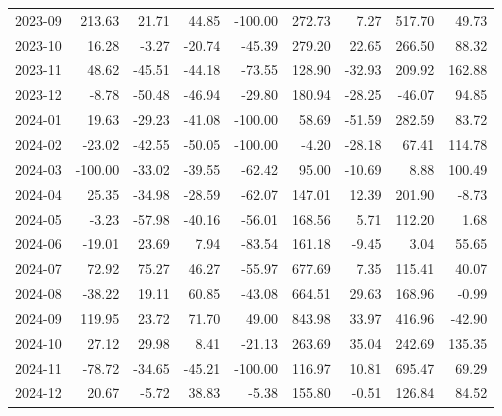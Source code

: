 \begin{table}[ht]
\begin{tabular}{lrrrrrrrr}
  2023-09 & 213.63 & 21.71 & 44.85 & -100.00 & 272.73 & 7.27 & 517.70 & 49.73 \\ 
  2023-10 & 16.28 & -3.27 & -20.74 & -45.39 & 279.20 & 22.65 & 266.50 & 88.32 \\ 
  2023-11 & 48.62 & -45.51 & -44.18 & -73.55 & 128.90 & -32.93 & 209.92 & 162.88 \\ 
  2023-12 & -8.78 & -50.48 & -46.94 & -29.80 & 180.94 & -28.25 & -46.07 & 94.85 \\ 
  2024-01 & 19.63 & -29.23 & -41.08 & -100.00 & 58.69 & -51.59 & 282.59 & 83.72 \\ 
  2024-02 & -23.02 & -42.55 & -50.05 & -100.00 & -4.20 & -28.18 & 67.41 & 114.78 \\ 
  2024-03 & -100.00 & -33.02 & -39.55 & -62.42 & 95.00 & -10.69 & 8.88 & 100.49 \\ 
  2024-04 & 25.35 & -34.98 & -28.59 & -62.07 & 147.01 & 12.39 & 201.90 & -8.73 \\ 
  2024-05 & -3.23 & -57.98 & -40.16 & -56.01 & 168.56 & 5.71 & 112.20 & 1.68 \\ 
  2024-06 & -19.01 & 23.69 & 7.94 & -83.54 & 161.18 & -9.45 & 3.04 & 55.65 \\ 
  2024-07 & 72.92 & 75.27 & 46.27 & -55.97 & 677.69 & 7.35 & 115.41 & 40.07 \\ 
  2024-08 & -38.22 & 19.11 & 60.85 & -43.08 & 664.51 & 29.63 & 168.96 & -0.99 \\ 
  2024-09 & 119.95 & 23.72 & 71.70 & 49.00 & 843.98 & 33.97 & 416.96 & -42.90 \\ 
  2024-10 & 27.12 & 29.98 & 8.41 & -21.13 & 263.69 & 35.04 & 242.69 & 135.35 \\ 
  2024-11 & -78.72 & -34.65 & -45.21 & -100.00 & 116.97 & 10.81 & 695.47 & 69.29 \\ 
  2024-12 & 20.67 & -5.72 & 38.83 & -5.38 & 155.80 & -0.51 & 126.84 & 84.52 \\ 
   \hline
\end{tabular}
\end{table}
